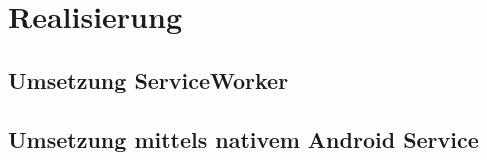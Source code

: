 \section{Realisierung}
\subsection{Umsetzung ServiceWorker}

\subsection{Umsetzung mittels nativem Android Service}